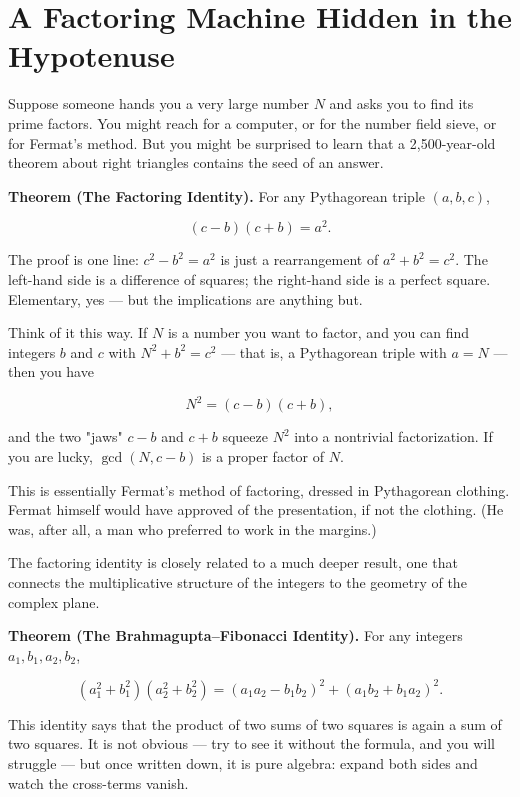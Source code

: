 \section{A Factoring Machine Hidden in the Hypotenuse}


Suppose someone hands you a very large number $N$ and asks you to find its prime factors. You might reach for a computer, or for the number field sieve, or for Fermat's method. But you might be surprised to learn that a 2,500-year-old theorem about right triangles contains the seed of an answer.

\textbf{Theorem (The Factoring Identity).} For any Pythagorean triple $(a, b, c)$,

\[
(c - b)(c + b) = a^2.
\]

The proof is one line: $c^2 - b^2 = a^2$ is just a rearrangement of $a^2 + b^2 = c^2$. The left-hand side is a difference of squares; the right-hand side is a perfect square. Elementary, yes --- but the implications are anything but.

Think of it this way. If $N$ is a number you want to factor, and you can find integers $b$ and $c$ with $N^2 + b^2 = c^2$ --- that is, a Pythagorean triple with $a = N$ --- then you have

\[
N^2 = (c - b)(c + b),
\]

and the two "jaws" $c - b$ and $c + b$ squeeze $N^2$ into a nontrivial factorization. If you are lucky, $\gcd(N, c - b)$ is a proper factor of $N$.

This is essentially Fermat's method of factoring, dressed in Pythagorean clothing. Fermat himself would have approved of the presentation, if not the clothing. (He was, after all, a man who preferred to work in the margins.)

The factoring identity is closely related to a much deeper result, one that connects the multiplicative structure of the integers to the geometry of the complex plane.

\textbf{Theorem (The Brahmagupta–Fibonacci Identity).} For any integers $a_1, b_1, a_2, b_2$,

\[
(a_1^2 + b_1^2)(a_2^2 + b_2^2) = (a_1 a_2 - b_1 b_2)^2 + (a_1 b_2 + b_1 a_2)^2.
\]

This identity says that the product of two sums of two squares is again a sum of two squares. It is not obvious --- try to see it without the formula, and you will struggle --- but once written down, it is pure algebra: expand both sides and watch the cross-terms vanish.


